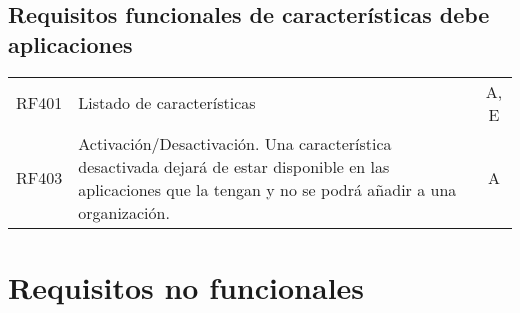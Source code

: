 \subsection{Requisitos funcionales de características debe aplicaciones}
\begin{table}[hbt!]
  \centering
  \setlength\extrarowheight{14pt}
  \begin{tabularx}{\textwidth}{cXc}
    RF401\label{RF401} & Listado de características & A, E \\
    RF403\label{RF403} & Activación/Desactivación. Una característica desactivada dejará de estar disponible en las aplicaciones que la tengan y no se podrá añadir a una organización. & A \\
  \end{tabularx}
  \label{cuadro:requisitos-de-aplicaciones}
\end{table}

\section{Requisitos no funcionales}